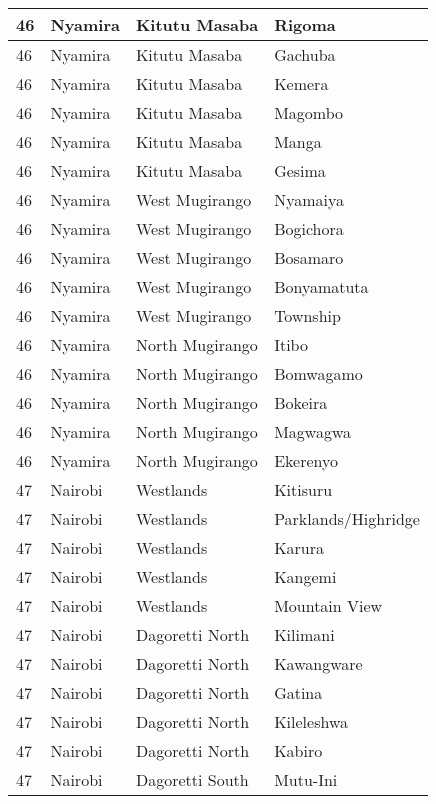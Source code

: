 \begin{table}[!ht]
\begin{tabular}{|l|l|l|l|}
        46 & Nyamira & Kitutu Masaba & Rigoma \\ \hline
        46 & Nyamira & Kitutu Masaba & Gachuba \\ \hline
        46 & Nyamira & Kitutu Masaba & Kemera \\ \hline
        46 & Nyamira & Kitutu Masaba & Magombo \\ \hline
        46 & Nyamira & Kitutu Masaba & Manga \\ \hline
        46 & Nyamira & Kitutu Masaba & Gesima \\ \hline
        46 & Nyamira & West Mugirango & Nyamaiya \\ \hline
        46 & Nyamira & West Mugirango & Bogichora \\ \hline
        46 & Nyamira & West Mugirango & Bosamaro \\ \hline
        46 & Nyamira & West Mugirango & Bonyamatuta \\ \hline
        46 & Nyamira & West Mugirango & Township \\ \hline
        46 & Nyamira & North Mugirango & Itibo \\ \hline
        46 & Nyamira & North Mugirango & Bomwagamo \\ \hline
        46 & Nyamira & North Mugirango & Bokeira \\ \hline
        46 & Nyamira & North Mugirango & Magwagwa \\ \hline
        46 & Nyamira & North Mugirango & Ekerenyo \\ \hline
        47 & Nairobi & Westlands & Kitisuru \\ \hline
        47 & Nairobi & Westlands & Parklands/Highridge \\ \hline
        47 & Nairobi & Westlands & Karura \\ \hline
        47 & Nairobi & Westlands & Kangemi \\ \hline
        47 & Nairobi & Westlands & Mountain View \\ \hline
        47 & Nairobi & Dagoretti North & Kilimani \\ \hline
        47 & Nairobi & Dagoretti North & Kawangware \\ \hline
        47 & Nairobi & Dagoretti North & Gatina \\ \hline
        47 & Nairobi & Dagoretti North & Kileleshwa \\ \hline
        47 & Nairobi & Dagoretti North & Kabiro \\ \hline
        47 & Nairobi & Dagoretti South & Mutu-Ini \\ \hline

\end{tabular}
\end{table}
